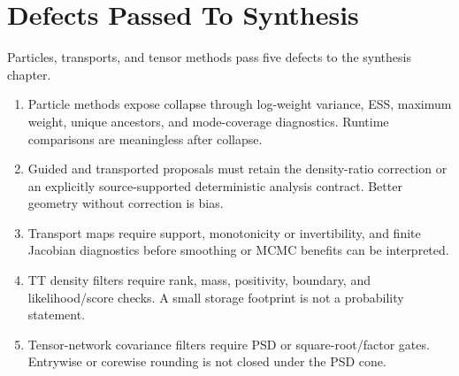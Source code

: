 \section{Defects Passed To Synthesis}
\label{sec:bf-hd-ptt-defects}

Particles, transports, and tensor methods pass five defects to the synthesis
chapter.

\begin{enumerate}[label=(\arabic*)]
  \item Particle methods expose collapse through log-weight variance, ESS,
  maximum weight, unique ancestors, and mode-coverage diagnostics.  Runtime
  comparisons are meaningless after collapse.
  \item Guided and transported proposals must retain the density-ratio
  correction or an explicitly source-supported deterministic analysis
  contract.  Better geometry without correction is bias.
  \item Transport maps require support, monotonicity or invertibility, and
  finite Jacobian diagnostics before smoothing or MCMC benefits can be
  interpreted.
  \item TT density filters require rank, mass, positivity, boundary, and
  likelihood/score checks.  A small storage footprint is not a probability
  statement.
  \item Tensor-network covariance filters require PSD or square-root/factor
  gates.  Entrywise or corewise rounding is not closed under the PSD cone.
\end{enumerate}


